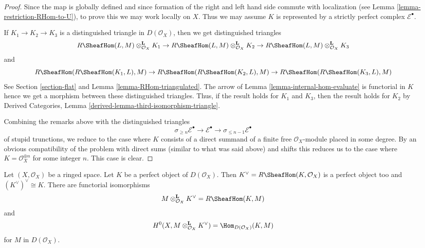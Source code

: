 \begin{proof}
Since the map is globally defined and since formation of the right and
left hand side commute with localization
(see Lemma \ref{lemma-restriction-RHom-to-U}), to prove this we may work
locally on $X$. Thus we may assume $K$ is represented by a strictly
perfect complex $\mathcal{E}^\bullet$.

\medskip\noindent
If $K_1 \to K_2 \to K_3$ is a distinguished triangle in $D(\mathcal{O}_X)$,
then we get distinguished triangles
$$
R\SheafHom(L, M) \otimes_{\mathcal{O}_X}^\mathbf{L} K_1 \to
R\SheafHom(L, M) \otimes_{\mathcal{O}_X}^\mathbf{L} K_2 \to
R\SheafHom(L, M) \otimes_{\mathcal{O}_X}^\mathbf{L} K_3
$$
and
$$
R\SheafHom(R\SheafHom(K_1, L), M) \to
R\SheafHom(R\SheafHom(K_2, L), M) \to
R\SheafHom(R\SheafHom(K_3, L), M)
$$
See Section \ref{section-flat} and
Lemma \ref{lemma-RHom-triangulated}.
The arrow of Lemma \ref{lemma-internal-hom-evaluate} is functorial in $K$
hence we get a morphism between these distinguished triangles.
Thus, if the result holds for $K_1$ and $K_3$, then the result holds for
$K_2$ by Derived Categories, Lemma
\ref{derived-lemma-third-isomorphism-triangle}.

\medskip\noindent
Combining the remarks above with the distinguished triangles
$$
\sigma_{\geq n}\mathcal{E}^\bullet \to \mathcal{E}^\bullet \to
\sigma_{\leq n - 1}\mathcal{E}^\bullet
$$
of stupid trunctions, we reduce to the case where $K$ consists
of a direct summand of a finite free $\mathcal{O}_X$-module placed
in some degree. By an obvious compatibility of the problem with direct sums
(similar to what was said above) and shifts this reduces us to the case
where $K = \mathcal{O}_X^{\oplus n}$ for some integer $n$.
This case is clear.
\end{proof}

\begin{lemma}
\label{lemma-dual-perfect-complex}
Let $(X, \mathcal{O}_X)$ be a ringed space. Let $K$ be a perfect object of
$D(\mathcal{O}_X)$. Then $K^\vee = R\SheafHom(K, \mathcal{O}_X)$ is a
perfect object too and $(K^\vee)^\vee \cong K$. There are
functorial isomorphisms
$$
M \otimes^\mathbf{L}_{\mathcal{O}_X} K^\vee = R\SheafHom(K, M)
$$
and
$$
H^0(X, M \otimes^\mathbf{L}_{\mathcal{O}_X} K^\vee) =
\Hom_{D(\mathcal{O}_X)}(K, M)
$$
for $M$ in $D(\mathcal{O}_X)$.
\end{lemma}

